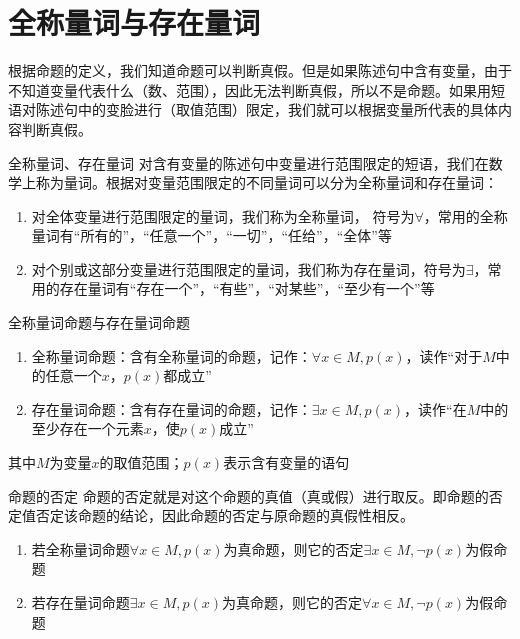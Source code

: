 \section{全称量词与存在量词}
根据命题的定义，我们知道命题可以判断真假。但是如果陈述句中含有变量，由于不知道变量代表什么（数、范围），因此无法判断真假，所以不是命题。如果用短语对陈述句中的变脸进行（取值范围）限定，我们就可以根据变量所代表的具体内容判断真假。

\begin{definition}{全称量词、存在量词}
对含有变量的陈述句中\textcolor{third}{变量}进行范围限定的短语，我们在数学上称为\textcolor{third}{量词}。根据对变量范围限定的不同量词可以分为全称量词和存在量词：
\begin{enumerate}
\item 对全体变量进行范围限定的量词，我们称为\textcolor{third}{全称量词}， 符号为$\forall$，常用的全称量词有“所有的”，“任意一个”，“一切”，“任给”，“全体”等
\item 对个别或这部分变量进行范围限定的量词，我们称为\textcolor{third}{存在量词}，符号为$\exists$，常用的存在量词有“存在一个”，“有些”，“对某些”，“至少有一个”等 
\end{enumerate}
\end{definition}

\begin{definition}{全称量词命题与存在量词命题}{}
\begin{enumerate}
\item 全称量词命题：含有全称量词的命题，记作：$\forall x \in M, p(x)$，读作“对于$M$中的任意一个$x$，$p(x)$都成立”
\item 存在量词命题：含有存在量词的命题，记作：$\exists x \in M, p(x)$，读作“在$M$中的至少存在一个元素$x$，使$p(x)$成立”
\end{enumerate}
其中$M$为变量$x$的取值范围；$p(x)$表示含有变量的语句
\end{definition}

\begin{definition}{命题的否定}
命题的否定就是对这个命题的真值（真或假）进行取反。即命题的否定值否定该命题的结论，因此命题的否定与原命题的真假性相反。
\end{definition}

\begin{remark}
	\begin{enumerate}
		\item 若全称量词命题$\forall x \in M, p(x)$为真命题，则它的否定$\exists x \in M, \neg p(x)$为假命题
		\item 若存在量词命题$\exists x \in M, p(x)$为真命题，则它的否定$\forall x \in M, \neg p(x)$为假命题
	\end{enumerate}
\end{remark}



